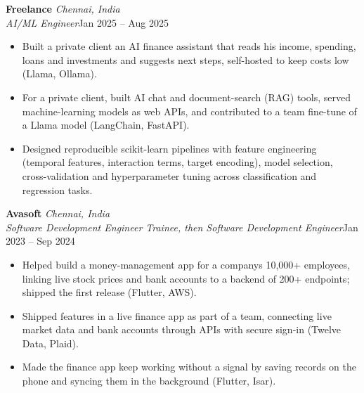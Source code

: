 \documentclass[a4paper,11pt]{article}
\newcommand{\role}[4]{%
  \textbf{#1}{\color{muted}\,\textperiodcentered\,\textit{#2}}\\
  \textit{#4}\hfill{\color{muted}#3}\par}
\newcommand{\gap}{\vspace{5pt}}
\begin{document}
\gap
{}
\role{Freelance}{Chennai, India}{Jan 2025 – Aug 2025}{AI/ML Engineer}
\begin{itemize}
  \item Built a private client an AI finance assistant that reads his income, spending, loans and investments and suggests next steps, self-hosted to keep costs low (Llama, Ollama).
  \item For a private client, built AI chat and document-search (RAG) tools, served machine-learning models as web APIs, and contributed to a team fine-tune of a Llama model (LangChain, FastAPI).
  \item Designed reproducible scikit-learn pipelines with feature engineering (temporal features, interaction terms, target encoding), model selection, cross-validation and hyperparameter tuning across classification and regression tasks.
\end{itemize}
\gap
{}
\role{Avasoft}{Chennai, India}{Jan 2023 – Sep 2024}{Software Development Engineer Trainee, then Software Development Engineer}
\begin{itemize}
  \item Helped build a money-management app for a company\textquotesingle{}s 10,000+ employees, linking live stock prices and bank accounts to a backend of 200+ endpoints; shipped the first release (Flutter, AWS).
  \item Shipped features in a live finance app as part of a team, connecting live market data and bank accounts through APIs with secure sign-in (Twelve Data, Plaid).
  \item Made the finance app keep working without a signal by saving records on the phone and syncing them in the background (Flutter, Isar).
\end{itemize}
\end{document}
